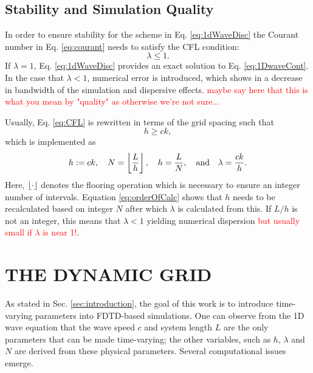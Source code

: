 \documentclass[fleqn]{jaes}
\def\SBcomment[#1]{\textcolor{red}{#1}}
\begin{document}
\subsection{Stability and Simulation Quality}\label{sec:quality}
In order to ensure stability for the scheme in Eq. \eqref{eq:1dWaveDisc} the Courant number in Eq. \eqref{eq:courant} needs to satisfy the CFL condition:
\begin{equation}\label{eq:CFL}
    \lambda \leq 1.
\end{equation}
%
If $\lambda = 1$, Eq. \eqref{eq:1dWaveDisc} provides an exact solution to Eq. \eqref{eq:1DwaveCont}. In the case that $\lambda < 1$, numerical error is introduced, which shows in a decrease in bandwidth of the simulation and dispersive effects. \SBcomment[maybe say here that this is what you mean by "quality" as otherwise we're not sure...]

Usually, Eq. \eqref{eq:CFL} is rewritten in terms of the grid spacing such that
\begin{equation}\label{eq:stabilityCond}
    h \geq c k,
\end{equation}
which is implemented as
\begin{equation}\label{eq:orderOfCalc}
    h:=ck, \quad N = \floor[\frac{L}{h}],\quad h = \frac{L}{N},\qaq \lambda = \frac{ck}{h}.
\end{equation}
Here, $\floor[\cdot]$ denotes the flooring operation which is necessary to ensure an integer number of intervals. Equation \eqref{eq:orderOfCalc} shows that $h$ needs to be recalculated based on integer $N$ after which $\lambda$ is calculated from this. If $L/h$ is not an integer, this means that $\lambda < 1$ yielding numerical dispersion \SBcomment[but usually small if $\lambda$ is near 1!]. 

\section{THE DYNAMIC GRID}\label{sec:dynamicGrid}
As stated in Sec. \ref{sec:introduction}, the goal of this work is to introduce time-varying parameters into FDTD-based simulations. 
One can observe from the 1D wave equation that the wave speed $c$ and system length $L$ are the only parameters that can be made time-varying; the other variables, such as $h$, $\lambda$ and $N$ are derived from these physical parameters. Several computational issues emerge. 
\end{document}
